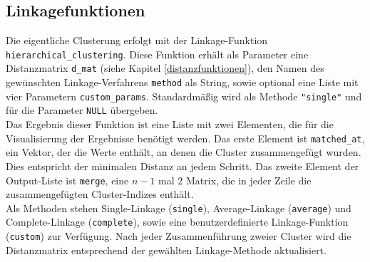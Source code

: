 \documentclass[12pt]{article}
\begin{document}
\subsection{Linkagefunktionen}
\label{linkage-funktionen}

Die eigentliche Clusterung erfolgt mit der Linkage-Funktion \verb*|hierarchical_clustering|. Diese Funktion erhält als Parameter eine Distanzmatrix \verb*|d_mat| (siehe Kapitel \ref{distanzfunktionen}), den Namen des gewünschten Linkage-Verfahrens \verb*|method| als String, sowie optional eine Liste mit vier Parametern \verb*|custom_params|. Standardmäßig wird als Methode \verb*|"single"| und für die Parameter \verb*|NULL| übergeben.\\
Das Ergebnis dieser Funktion ist eine Liste mit zwei Elementen, die für die Visualisierung der Ergebnisse benötigt werden. Das erste Element ist \verb*|matched_at|, ein Vektor, der die Werte enthält, an denen die Cluster zusammengefügt wurden. Dies entspricht der minimalen Distanz an jedem Schritt. Das zweite Element der Output-Liste ist \verb*|merge|, eine $n-1$ mal $2$ Matrix, die in jeder Zeile die zusammengefügten Cluster-Indizes enthält.\\
Als Methoden stehen Single-Linkage (\verb*|single|), Average-Linkage (\verb*|average|) und Complete-Linkage (\verb*|complete|), sowie eine benutzerdefinierte Linkage-Funktion (\verb*|custom|) zur Verfügung. Nach jeder Zusammenführung zweier Cluster wird die Distanzmatrix entsprechend der gewählten Linkage-Methode aktualisiert.
\end{document}

